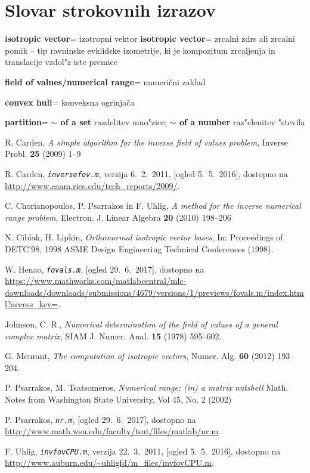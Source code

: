\documentclass[12pt,a4paper]{amsart}
\theoremstyle{definition}
\theoremstyle{plain}
\newcommand{\geslo}[2]{\noindent\textbf{#1}\hspace*{3mm}\hangindent=\parindent\hangafter=1 #2}
\begin{document}
\section*{Slovar strokovnih izrazov}

\geslo{isotropic vector}{izotropni vektor}
\geslo{isotropic vector}{zrcalni zdrs ali zrcalni pomik -- tip ravninske evklidske izometrije, ki je kompozitum zrcaljenja in translacije vzdol"z iste premice}

\geslo{field of values/numerical range}{numerični zaklad}

\geslo{convex hull}{konveksna ogrinjača}

\geslo{partition}{\textbf{$\sim$ of a set} razdelitev mno"zice; \textbf{$\sim$ of a number} raz"clenitev "stevila}

\begin{thebibliography}{99}



R. Carden, \emph{A simple algorithm for the inverse field of values problem}, Inverse Probl. {\bf 25} (2009) 1--9

R. Carden, \emph{\texttt{inversefov.m}}, verzija 6.~2.~2011, [ogled 5.~5.~2016], dostopno na \url{http://www.caam.rice.edu/tech_reports/2009/}.

C. Chorianopoulos, P. Psarrakos in F. Uhlig, \emph{A method for the inverse numerical range problem}, Electron. J. Linear Algebra {\bf 20} (2010) 198--206

N. Ciblak, H. Lipkin, \emph{Orthonormal isotropic vector bases}, In: Proceedings of DETC'98, 1998 ASME Design Engineering Technical Conferences (1998).

W. Henao, \emph{\texttt{fovals.m}}, [ogled 29.~6.~2017], dostopno na \url{https://www.mathworks.com/matlabcentral/mlc-downloads/downloads/submissions/4679/versions/1/previews/fovals.m/index.html?access_key=}.

Johnson, C. R., \emph{Numerical determination of the field of values of a general complex matrix}, SIAM J. Numer. Anal. {\bf 15} (1978) 595--602.

G. Meurant, \emph{The computation of isotropic vectors}, Numer. Alg. {\bf 60} (2012) 193--204.

P. Psarrakos, M. Tsatsomeros, \emph{Numerical range: (in) a matrix nutshell} Math. Notes from Washington State University,  Vol 45, No. 2 (2002)

P. Psarrakos, \emph{\texttt{nr.m}}, [ogled 29.~6.~2017], dostopno na \url{http://www.math.wsu.edu/faculty/tsat/files/matlab/nr.m}.

F. Uhlig, \emph{\texttt{invfovCPU.m}}, verzija 22.~3.~2011, [ogled 5.~5.~2016], dostopno na \url{http://www.auburn.edu/~uhligfd/m_files/invfovCPU.m}.

\end{thebibliography}
\end{document}
